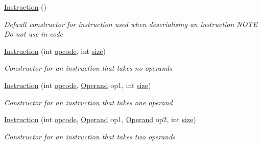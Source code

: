 \begin{DoxyCompactItemize}
\item 
\hyperlink{class_c_p_u___o_s___simulator_1_1_c_p_u_1_1_instruction_a2038c543e7b47a5997405f56cb8c7aa9}{Instruction} ()
\begin{DoxyCompactList}\small\item\em Default constructor for instruction used when deserialising an instruction N\+O\+T\+E Do not use in code \end{DoxyCompactList}\item 
\hyperlink{class_c_p_u___o_s___simulator_1_1_c_p_u_1_1_instruction_ac1fdbf424188acb7f10a1fa93e12a559}{Instruction} (int \hyperlink{class_c_p_u___o_s___simulator_1_1_c_p_u_1_1_instruction_aa8fa753bf6e1b6ffff7060ec90f930af}{opcode}, int \hyperlink{class_c_p_u___o_s___simulator_1_1_c_p_u_1_1_instruction_a8c533b0c08d8ac0a85b0e342f95cfeec}{size})
\begin{DoxyCompactList}\small\item\em Constructor for an instruction that takes no operands \end{DoxyCompactList}\item 
\hyperlink{class_c_p_u___o_s___simulator_1_1_c_p_u_1_1_instruction_a2388e9123d02cd845d84a8c8dff7a816}{Instruction} (int \hyperlink{class_c_p_u___o_s___simulator_1_1_c_p_u_1_1_instruction_aa8fa753bf6e1b6ffff7060ec90f930af}{opcode}, \hyperlink{class_c_p_u___o_s___simulator_1_1_c_p_u_1_1_operand}{Operand} op1, int \hyperlink{class_c_p_u___o_s___simulator_1_1_c_p_u_1_1_instruction_a8c533b0c08d8ac0a85b0e342f95cfeec}{size})
\begin{DoxyCompactList}\small\item\em Constructor for an instruction that takes one operand \end{DoxyCompactList}\item 
\hyperlink{class_c_p_u___o_s___simulator_1_1_c_p_u_1_1_instruction_af3092d713df3c95ad0e5414317aacc65}{Instruction} (int \hyperlink{class_c_p_u___o_s___simulator_1_1_c_p_u_1_1_instruction_aa8fa753bf6e1b6ffff7060ec90f930af}{opcode}, \hyperlink{class_c_p_u___o_s___simulator_1_1_c_p_u_1_1_operand}{Operand} op1, \hyperlink{class_c_p_u___o_s___simulator_1_1_c_p_u_1_1_operand}{Operand} op2, int \hyperlink{class_c_p_u___o_s___simulator_1_1_c_p_u_1_1_instruction_a8c533b0c08d8ac0a85b0e342f95cfeec}{size})
\begin{DoxyCompactList}\small\item\em Constructor for an instruction that takes two operands \end{DoxyCompactList}\item 

\end{DoxyCompactItemize}
